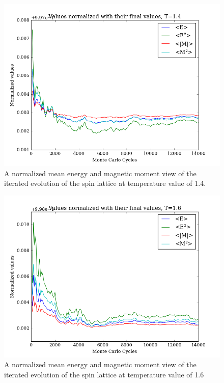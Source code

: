 \documentclass[11pt,a4paper,notitlepage,twocolumn]{article}
\begin{document}
\begin{figure}
[H]\center
\includegraphics[scale=0.35]{../figs/4c/Prob_L20_mc100000_T140_spinrandom.png}
\caption{A normalized mean energy and magnetic moment view of the iterated evolution of the spin lattice at temperature value of 1.4.}
\end{figure}
\begin{figure}
[H]\center
\includegraphics[scale=0.35]{../figs/4c/Prob_L20_mc100000_T160_spinrandom.png}
\caption{A normalized mean energy and magnetic moment view of the iterated evolution of the spin lattice at temperature value of 1.6}
\end{figure}
\end{document}
